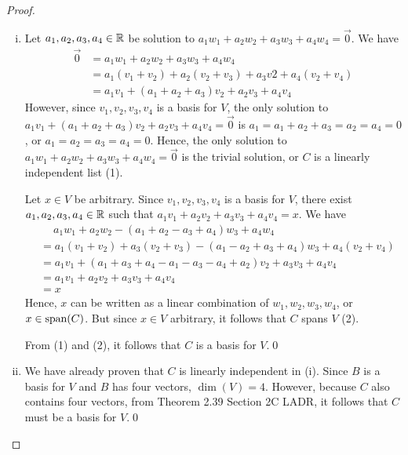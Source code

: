\begin{proof}
    \renewcommand{\qedsymbol}{$\blacksquare$}
    \begin{enumerate}[(i)]
        \item Let $a_1,a_2,a_3,a_4\in\mathbb R$ be solution to $a_1w_1+a_2w_2+a_3w_3+a_4w_4=\vec{0}$. We have 
        \[
            \begin{aligned}
                \vec{0} &= a_1w_1+a_2w_2+a_3w_3+a_4w_4\\
                        &= a_1(v_1+v_2)+a_2(v_2+v_3)+a_3v2+a_4(v_2+v_4)\\
                        &= a_1v_1+(a_1+a_2+a_3)v_2+a_2v_3+a_4v_4      
            \end{aligned}
        \]
        However, since $v_1,v_2,v_3,v_4$ is a basis for $V$, the only solution to $a_1v_1+(a_1+a_2+a_3)v_2+a_2v_3+a_4v_4=\vec{0}$ is $a_1=a_1+a_2+a_3=a_2=a_4=0$, or $a_1=a_2=a_3=a_4=0$.
        Hence, the only solution to $a_1w_1+a_2w_2+a_3w_3+a_4w_4=\vec{0}$ is the trivial solution, or $C$ is a linearly independent list (1).
        
        Let $x\in V$ be arbitrary. Since $v_1,v_2,v_3,v_4$ is a basis for $V$, there exist $a_1,a_2,a_3,a_4\in\mathbb R$ such that $a_1v_1+a_2v_2+a_3v_3+a_4v_4=x$.
        We have 
        \[
            \begin{aligned}
                &\quad \ a_1w_1+a_2w_2-(a_1+a_2-a_3+a_4)w_3+a_4w_4\\
                &= a_1(v_1+v_2)+a_3(v_2+v_3)-(a_1-a_2+a_3+a_4)w_3+a_4(v_2+v_4)\\
                &= a_1v_1+(a_1+a_3+a_4-a_1-a_3-a_4+a_2)v_2+a_3v_3+a_4v_4\\
                &= a_1v_1+a_2v_2+a_3v_3+a_4v_4\\
                &= x
            \end{aligned}
        \]
        Hence, $x$ can be written as a linear combination of $w_1,w_2,w_3,w_4$, or $x\in\textnormal{span}(C)$. But since $x\in V$ arbitrary, it follows that $C$ spans $V$ (2).

        From (1) and (2), it follows that $C$ is a basis for $V$.\qed
        \item We have already proven that $C$ is linearly independent in (i). Since $B$ is a basis for $V$ and $B$ has four vectors, $\dim(V)=4$. However, because $C$ also contains four vectors, from Theorem 2.39 Section 2C LADR, it follows that $C$ must be a basis for $V$.\qed
    \end{enumerate}
    \renewcommand{\qedsymbol}{}
\end{proof}